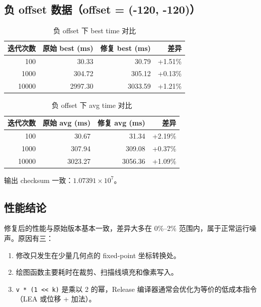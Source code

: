 \documentclass[12pt,a4paper]{article}
\begin{document}
\subsection{负 offset 数据（offset = (-120, -120)）}

\begin{table}[h]
\centering
\caption{负 offset 下 best time 对比}
\begin{tabular}{rrrr}
\toprule
\textbf{迭代次数} & \textbf{原始 best (ms)} & \textbf{修复 best (ms)} & \textbf{差异} \\
\midrule
100   & 30.33 & 30.79 & +1.51\% \\
1000  & 304.72 & 305.12 & +0.13\% \\
10000 & 2997.30 & 3033.59 & +1.21\% \\
\bottomrule
\end{tabular}
\end{table}

\begin{table}[h]
\centering
\caption{负 offset 下 avg time 对比}
\begin{tabular}{rrrr}
\toprule
\textbf{迭代次数} & \textbf{原始 avg (ms)} & \textbf{修复 avg (ms)} & \textbf{差异} \\
\midrule
100   & 30.67 & 31.34 & +2.19\% \\
1000  & 307.94 & 309.08 & +0.37\% \\
10000 & 3023.27 & 3056.36 & +1.09\% \\
\bottomrule
\end{tabular}
\end{table}

输出 checksum 一致：$1.07391 \times 10^7$。

\subsection{性能结论}

修复后的性能与原始版本基本一致，差异大多在 0\%–2\% 范围内，属于正常运行噪声。原因有三：

\begin{enumerate}[leftmargin=*]
    \item 修改只发生在少量几何点的 fixed-point 坐标转换处。
    \item 绘图函数主要耗时在裁剪、扫描线填充和像素写入。
    \item \texttt{v * (1 << k)} 是乘以 2 的幂，Release 编译器通常会优化为等价的低成本指令（LEA 或位移 + 加法）。
\end{enumerate}
\end{document}
